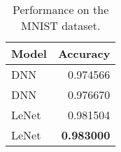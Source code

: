 \begin{table}[t]
\centering
\small
\caption{Performance on the MNIST dataset. }
\label{tab:baseline}
\begin{tabular}{lr}
\toprule
Model & Accuracy \\
\midrule
DNN & 0.974566 \\
DNN & 0.976670 \\
LeNet & 0.981504 \\
LeNet & \textbf{0.983000} \\
\bottomrule
\end{tabular}
\end{table}
